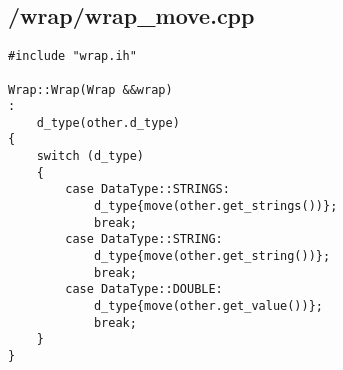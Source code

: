 \documentclass{article}
\begin{document}
\subsection*{/wrap/wrap\_move.cpp}
\begin{verbatim}
#include "wrap.ih"

Wrap::Wrap(Wrap &&wrap)
:
    d_type(other.d_type)
{
    switch (d_type)
    {
        case DataType::STRINGS:
            d_type{move(other.get_strings())};
            break;
        case DataType::STRING:
            d_type{move(other.get_string())};
            break;
        case DataType::DOUBLE:
            d_type{move(other.get_value())};
            break;
    }
}
\end{verbatim}
\end{document}
